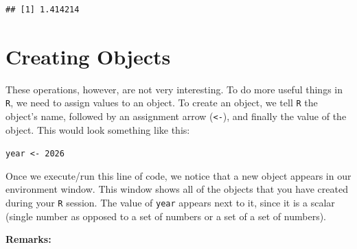 \documentclass[
  10pt,
  letterpaper,
  twoside,
  openright]{book}
\begin{document}
\begin{verbatim}
## [1] 1.414214
\end{verbatim}

\hypertarget{creating-objects}{%
\section{Creating Objects}\label{creating-objects}}

These operations, however, are not very interesting. To do more useful
things in \texttt{R}, we need to assign values to an object. To create
an object, we tell \texttt{R} the object's name, followed by an
assignment arrow (\texttt{\textless{}-}), and finally the value of the
object. This would look something like this:

\texttt{year\ \textless{}-\ 2026}

Once we execute/run this line of code, we notice that a new object
appears in our environment window. This window shows all of the objects
that you have created during your \texttt{R} session. The value of
\texttt{year} appears next to it, since it is a scalar (single number as
opposed to a set of numbers or a set of a set of numbers).

\textbf{Remarks:}
\end{document}
